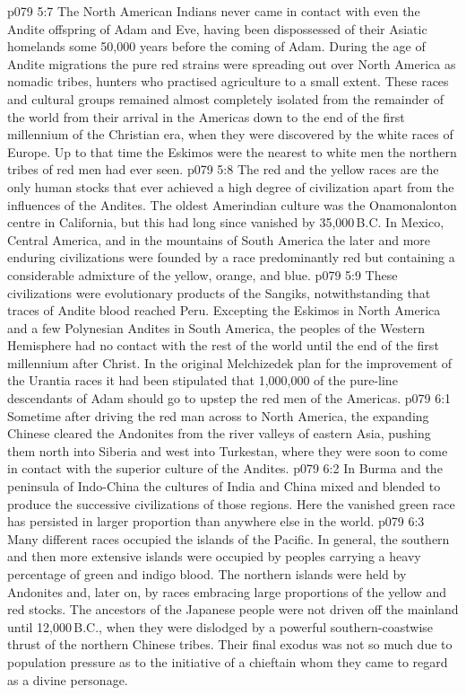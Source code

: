 \vs p079 5:7 The North American Indians never came in contact with even the Andite offspring of Adam and Eve, having been dispossessed of their Asiatic homelands some 50,000 years before the coming of Adam. During the age of Andite migrations the pure red strains were spreading out over North America as nomadic tribes, hunters who practised agriculture to a small extent. These races and cultural groups remained almost completely isolated from the remainder of the world from their arrival in the Americas down to the end of the first millennium of the Christian era, when they were discovered by the white races of Europe. Up to that time the Eskimos were the nearest to white men the northern tribes of red men had ever seen.
\vs p079 5:8 The red and the yellow races are the only human stocks that ever achieved a high degree of civilization apart from the influences of the Andites. The oldest Amerindian culture was the Onamonalonton centre in California, but this had long since vanished by 35,000\,B.C. In Mexico, Central America, and in the mountains of South America the later and more enduring civilizations were founded by a race predominantly red but containing a considerable admixture of the yellow, orange, and blue.
\vs p079 5:9 These civilizations were evolutionary products of the Sangiks, notwithstanding that traces of Andite blood reached Peru. Excepting the Eskimos in North America and a few Polynesian Andites in South America, the peoples of the Western Hemisphere had no contact with the rest of the world until the end of the first millennium after Christ. In the original Melchizedek plan for the improvement of the Urantia races it had been stipulated that 1,000,000 of the pure\hyp{}line descendants of Adam should go to upstep the red men of the Americas.
\vs p079 6:1 Sometime after driving the red man across to North America, the expanding Chinese cleared the Andonites from the river valleys of eastern Asia, pushing them north into Siberia and west into Turkestan, where they were soon to come in contact with the superior culture of the Andites.
\vs p079 6:2 In Burma and the peninsula of Indo\hyp{}China the cultures of India and China mixed and blended to produce the successive civilizations of those regions. Here the vanished green race has persisted in larger proportion than anywhere else in the world.
\vs p079 6:3 Many different races occupied the islands of the Pacific. In general, the southern and then more extensive islands were occupied by peoples carrying a heavy percentage of green and indigo blood. The northern islands were held by Andonites and, later on, by races embracing large proportions of the yellow and red stocks. The ancestors of the Japanese people were not driven off the mainland until 12,000\,B.C., when they were dislodged by a powerful southern\hyp{}coastwise thrust of the northern Chinese tribes. Their final exodus was not so much due to population pressure as to the initiative of a chieftain whom they came to regard as a divine personage.
